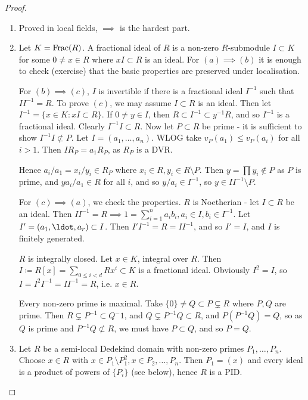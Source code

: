 \documentclass[10pt,a4paper]{article}
\begin{document}
\begin{proof}\hspace*{0cm}
  \begin{enumerate}
    \item Proved in local fields, $\implies$ is the hardest part.
    \item Let $K = \operatorname{Frac}(R)$. A fractional ideal of $R$ is a non-zero $R$-submodule $I \subset K$ for some $0 \neq x \in R$ where $xI \subset R$ is an ideal. For $(a)\implies (b)$ it is enough to check (exercise) that the basic properties are preserved under localisation.

    For $(b)\implies (c)$, $I$ is invertible if there is a fractional ideal $I^{-1}$ such that $II^{-1} = R$. To prove $(c)$, we may assume $I \subset R$ is an ideal. Then let $I^{-1} = \{x \in K : xI \subset R\}$. If $0 \neq y \in I$, then $R \subset I^{-1} \subset y^{-1}R$, and so $I^{-1}$ is a fractional ideal. Clearly $I^{-1}I \subset R$. Now let $P \subset R$ be prime - it is sufficient to show $I^{-1}I \nsubset P$. Let $I = (a_1, \ldots, a_n)$. WLOG take $v_P(a_1) \leq v_P(a_i)$ for all $i >1$. Then $IR_P = a_1R_P$, as $R_P$ is a DVR.

    Hence $a_i/a_1 = x_i/y_i \in R_P$ where $x_i \in R, y_i \in R\setminus P$. Then $y = \prod y_i \notin P$ as $P$ is prime, and $ya_i/a_1 \in R$ for all $i$, and so $y/a_i \in I^{-1}$, so $y \in II^{-1}\setminus P$.

    For $(c)\implies (a)$, we check the properties. $R$ is Noetherian - let $I \subset R$ be an ideal. Then $II^{-1} =R \implies 1 = \sum_{i=1}^n a_ib_i, a_i \in I, b_i \in I^{-1}$. Let $I' = (a_1, \ldot, a_r) \subset I$. Then $I'I^{-1} = R = II^{-1}$, and so $I' = I$, and $I$ is finitely generated.

    $R$ is integrally closed. Let $x \in K$, integral over $R$. Then $I \coloneqq R[x] = \sum_{0\leq i < d} Rx^i \subset K$ is a fractional ideal. Obviously $I^2 = I$, so $I = I^2I^{-1} = II^{-1} = R$, i.e. $x \in R$.

    Every non-zero prime is maximal. Take $\{0\} \neq Q \subset P \subsetneq R$ where $P,Q$ are prime. Then $R \subsetneq P^{-1} \subset Q{^-1}$, and $Q\subsetneq P^{-1}Q \subset R$, and $P(P^{-1}Q) = Q$, so as $Q$ is prime and $P^{-1}Q \nsubset R$, we must have $P\subset Q$, and so $P= Q$.

    \item Let $R$ be a semi-local Dedekind domain with non-zero primes $P_1, \ldots, P_n$. Choose $x \in R$ with $x \in P_1 \setminus P_1^2, x\in P_2, \ldots, P_n$. Then $P_1 = (x)$ and every ideal is a product of powers of $\{P_i\}$ (see below), hence $R$ is a PID.
  \end{enumerate}
\end{proof}
\end{document}
